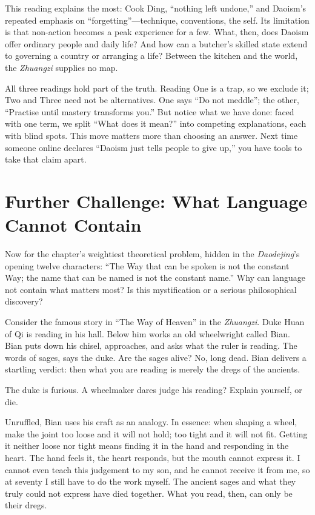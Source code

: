This reading explains the most: Cook Ding, ``nothing left undone,'' and Daoism's repeated emphasis on ``forgetting''---technique, conventions, the self. Its limitation is that non-action becomes a peak experience for a few. What, then, does Daoism offer ordinary people and daily life? And how can a butcher's skilled state extend to governing a country or arranging a life? Between the kitchen and the world, the \textit{Zhuangzi} supplies no map.

All three readings hold part of the truth. Reading One is a trap, so we exclude it; Two and Three need not be alternatives. One says ``Do not meddle''; the other, ``Practise until mastery transforms you.'' But notice what we have done: faced with one term, we split ``What does it mean?'' into competing explanations, each with blind spots. This move matters more than choosing an answer. Next time someone online declares ``Daoism just tells people to give up,'' you have tools to take that claim apart.

\section[Further Challenge: Beyond Language]{Further Challenge: What Language Cannot Contain}
Now for the chapter's weightiest theoretical problem, hidden in the \textit{Daodejing}'s opening twelve characters: ``The Way that can be spoken is not the constant Way; the name that can be named is not the constant name.'' Why can language not contain what matters most? Is this mystification or a serious philosophical discovery?

Consider the famous story in ``The Way of Heaven'' in the \textit{Zhuangzi}. Duke Huan of Qi is reading in his hall. Below him works an old wheelwright called Bian. Bian puts down his chisel, approaches, and asks what the ruler is reading. The words of sages, says the duke. Are the sages alive? No, long dead. Bian delivers a startling verdict: then what you are reading is merely the dregs of the ancients.

The duke is furious. A wheelmaker dares judge his reading? Explain yourself, or die.

Unruffled, Bian uses his craft as an analogy. In essence: when shaping a wheel, make the joint too loose and it will not hold; too tight and it will not fit. Getting it neither loose nor tight means finding it in the hand and responding in the heart. The hand feels it, the heart responds, but the mouth cannot express it. I cannot even teach this judgement to my son, and he cannot receive it from me, so at seventy I still have to do the work myself. The ancient sages and what they truly could not express have died together. What you read, then, can only be their dregs.

